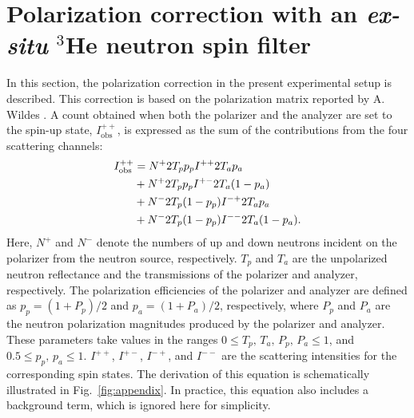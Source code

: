 \documentclass[%
 reprint,
superscriptaddress,
 amsmath,amssymb,
 aps,
floatfix,
]{revtex4-2}
\newcommand{\He}{$^3$He }
\begin{document}
\appendix
\section{Polarization correction with an \textit{ex-situ} \He neutron spin filter}
\label{appendix}
In this section, the polarization correction in the present experimental setup is described.
This correction is based on the polarization matrix reported by A. Wildes \cite{wildes_polarizer-analyzer_1999,wildes_scientific_2006}.
A count obtained when both the polarizer and the analyzer are set to the spin-up state, $I^{++}_\mathrm{obs}$, is expressed as the sum of the contributions from the four scattering channels:
\begin{align}
    I^{++}_\mathrm{obs} &= N^+ 2T_p p_p I^{++} 2T_a p_a \notag \\
    &+ N^+ 2T_p p_p I^{+-} 2T_a (1-p_a) \notag\\
    &+ N^- 2T_p (1-p_p) I^{-+} 2T_a p_a \notag \\
    &+ N^- 2T_p (1-p_p) I^{--} 2T_a (1-p_a).
    \label{eq:Ipp}
\end{align}
Here, $N^+$ and $N^-$ denote the numbers of up and down neutrons incident on the polarizer from the neutron source, respectively.
$T_p$ and $T_a$ are the unpolarized neutron reflectance and the transmissions of the polarizer and analyzer, respectively.
The polarization efficiencies of the polarizer and analyzer are defined as $p_p = (1+P_p)/2$ and $p_a = (1+P_a)/2$, respectively, where $P_p$ and $P_a$ are the neutron polarization magnitudes produced by the polarizer and analyzer.
These parameters take values in the ranges $0 \leq T_p,\, T_a,\, P_p,\,P_a  \leq 1$, and $0.5 \leq p_p,\, p_a \leq 1$.
$I^{++}$, $I^{+-}$, $I^{-+}$, and $I^{--}$ are the scattering intensities for the corresponding spin states.
The derivation of this equation is schematically illustrated in Fig.~\ref{fig:appendix}.
In practice, this equation also includes a background term, which is ignored here for simplicity.
\end{document}
